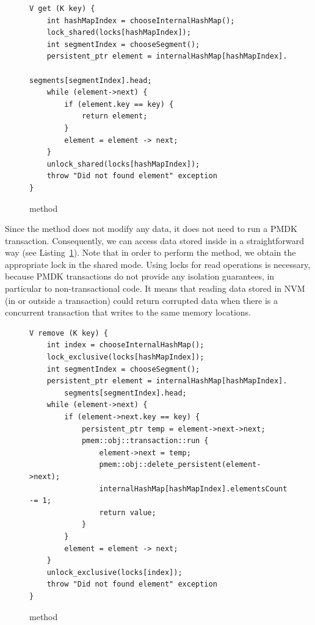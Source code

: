 \begin{figure}[ht]
\renewcommand{\figurename}{Listing}
\begin{lstlisting}
V get (K key) {
    int hashMapIndex = chooseInternalHashMap();
    lock_shared(locks[hashMapIndex]);
    int segmentIndex = chooseSegment();
    persistent_ptr element = internalHashMap[hashMapIndex].
                                    segments[segmentIndex].head;
    while (element->next) {
        if (element.key == key) {
            return element;
        }
        element = element -> next;
    }
    unlock_shared(locks[hashMapIndex]);
    throw "Did not found element" exception
}
\end{lstlisting}
\caption{\getMethod method}
\label{getMethod}
\end{figure}

        Since the \getMethod method does not modify any data, it does not need to run a PMDK transaction. Consequently, we can access data stored inside \internalHashMap in a straightforward way (see Listing~\ref{getMethod}). Note that in order to perform the \getMethod method, we obtain the appropriate lock in the shared mode. Using locks for read operations is necessary, because PMDK transactions do not provide any isolation guarantees, in particular to non-transactional code. It means that reading data stored in NVM (in or outside a transaction) could return corrupted data when there is a concurrent transaction that writes to the same memory locations. 

        
\begin{figure}[ht]
\renewcommand{\figurename}{Listing}
\begin{lstlisting}
V remove (K key) {
    int index = chooseInternalHashMap();
    lock_exclusive(locks[hashMapIndex]);
    int segmentIndex = chooseSegment();
    persistent_ptr element = internalHashMap[hashMapIndex].
        segments[segmentIndex].head;
    while (element->next) {
        if (element->next.key == key) {
            persistent_ptr temp = element->next->next;
            pmem::obj::transaction::run {
                element->next = temp;
                pmem::obj::delete_persistent(element->next);
                internalHashMap[hashMapIndex].elementsCount -= 1;
                return value;
            }
        }
        element = element -> next;
    } 
    unlock_exclusive(locks[index]);
    throw "Did not found element" exception
}
\end{lstlisting}
\caption{\removeMethod method}
\label{removeMethod}
\end{figure}

